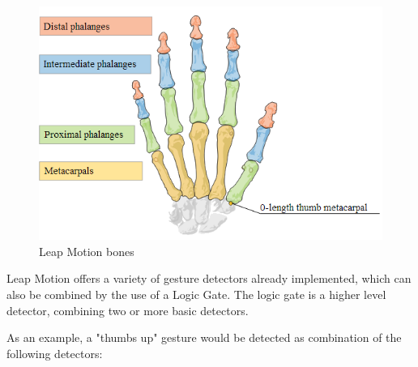 \documentclass[12pt,a4paper,twoside]{report}
\begin{document}
\begin{figure}[h]
  \centering
  \includegraphics[width=0.6\linewidth]{img/Leap_bones.png}
  \caption{Leap Motion bones}
  \label{fig:leap_bones}
\end{figure}

Leap Motion offers a variety of gesture detectors already implemented, which can also be combined by the use of a Logic Gate. The logic gate is a higher level detector, combining two or more basic detectors.

As an example, a "thumbs up" gesture would be detected as combination of the following detectors:
\end{document}
